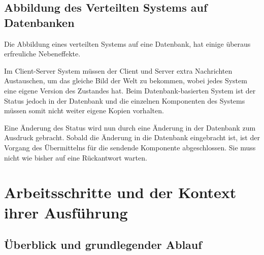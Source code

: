\subsection{Abbildung des Verteilten Systems auf Datenbanken}

Die Abbildung eines verteilten Systems auf eine Datenbank,
hat einige überaus erfreuliche Nebeneffekte.

Im Client-Server System müssen der Client und Server extra Nachrichten Austauschen, um das gleiche Bild der Welt zu bekommen, wobei jedes System eine eigene Version des Zustandes hat.
Beim Datenbank-basierten System ist der Status jedoch in der Datenbank und
die einzelnen Komponenten des Systems müssen somit nicht weiter eigene Kopien vorhalten.

Eine Änderung des Status wird nun durch eine Änderung in der Datenbank zum Ausdruck gebracht.
Sobald die Änderung in die Datenbank eingebracht ist,
ist der Vorgang des Übermittelns für die sendende Komponente abgeschlossen.
Sie muss nicht wie bisher auf eine Rückantwort warten.


\section{Arbeitsschritte und der Kontext ihrer Ausführung}
\subsection{Überblick und grundlegender Ablauf}

